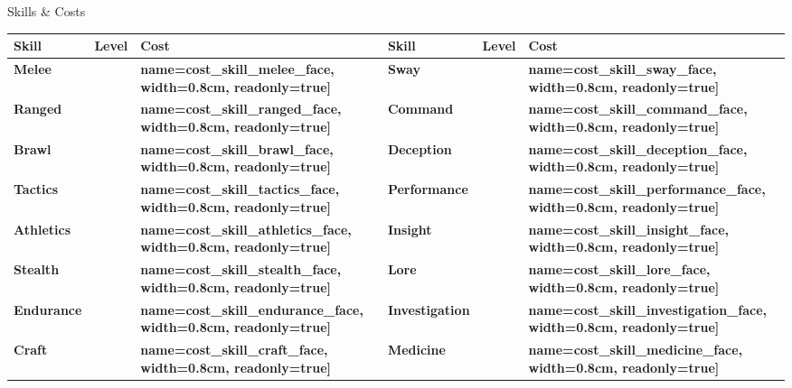 \documentclass[10pt]{article}
\newcommand{\skilldots}[1]{%
  \TextField[
    name=#1,
    bordercolor={0 0 0},
    backgroundcolor={255 255 255},
    readonly=false,
    width=1.5cm,
    height=0.45cm,
    maxlen=1,
    chars=2,
    align=0,
    default=0
  ]{}%
  \hspace{-0.2em}%
  \raisebox{0.4ex}{%
    \small%
    \textcolor{gray}{%
      \(\bigcirc\)\(\bigcirc\)\(\bigcirc\)\(\bigcirc\)\(\bigcirc\)%
    }%
  }%
}
\newcommand{\tf}[1]{\TextField[#1]{}}
\begin{document}
\begin{Form}
\begin{minipage}[t]{0.48\linewidth}
    \begin{charbox}{Skills \& Costs}
        \begin{tabular}{>{\bfseries}p{2.5cm} >{\bfseries}p{1.5cm} >{\bfseries}p{1.5cm} >{\bfseries}p{2.5cm} >{\bfseries}p{1.5cm} >{\bfseries}p{1.5cm}}
            \toprule
            \textbf{Skill} & \textbf{Level} & \textbf{Cost} & \textbf{Skill} & \textbf{Level} & \textbf{Cost} \\
            \midrule
            Melee & \skilldots{skill_melee_face} & \tf[name=cost_skill_melee_face, width=0.8cm, readonly=true]{} & 
            Sway & \skilldots{skill_sway_face} & \tf[name=cost_skill_sway_face, width=0.8cm, readonly=true]{} \\
            Ranged & \skilldots{skill_ranged_face} & \tf[name=cost_skill_ranged_face, width=0.8cm, readonly=true]{} & 
            Command & \skilldots{skill_command_face} & \tf[name=cost_skill_command_face, width=0.8cm, readonly=true]{} \\
            Brawl & \skilldots{skill_brawl_face} & \tf[name=cost_skill_brawl_face, width=0.8cm, readonly=true]{} & 
            Deception & \skilldots{skill_deception_face} & \tf[name=cost_skill_deception_face, width=0.8cm, readonly=true]{} \\
            Tactics & \skilldots{skill_tactics_face} & \tf[name=cost_skill_tactics_face, width=0.8cm, readonly=true]{} & 
            Performance & \skilldots{skill_performance_face} & \tf[name=cost_skill_performance_face, width=0.8cm, readonly=true]{} \\
            Athletics & \skilldots{skill_athletics_face} & \tf[name=cost_skill_athletics_face, width=0.8cm, readonly=true]{} & 
            Insight & \skilldots{skill_insight_face} & \tf[name=cost_skill_insight_face, width=0.8cm, readonly=true]{} \\
            Stealth & \skilldots{skill_stealth_face} & \tf[name=cost_skill_stealth_face, width=0.8cm, readonly=true]{} & 
            Lore & \skilldots{skill_lore_face} & \tf[name=cost_skill_lore_face, width=0.8cm, readonly=true]{} \\
            Endurance & \skilldots{skill_endurance_face} & \tf[name=cost_skill_endurance_face, width=0.8cm, readonly=true]{} & 
            Investigation & \skilldots{skill_investigation_face} & \tf[name=cost_skill_investigation_face, width=0.8cm, readonly=true]{} \\
            Craft & \skilldots{skill_craft_face} & \tf[name=cost_skill_craft_face, width=0.8cm, readonly=true]{} & 
            Medicine & \skilldots{skill_medicine_face} & \tf[name=cost_skill_medicine_face, width=0.8cm, readonly=true]{} \\

\end{tabular}
\end{charbox}
\end{minipage}
\end{Form}
\end{document}

